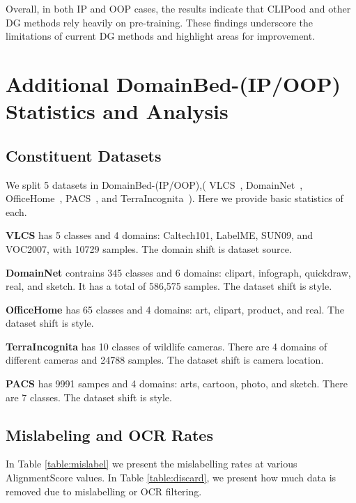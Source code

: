 \documentclass{article} %
\begin{document}
Overall, in both IP and OOP cases, the results indicate that CLIPood and other DG methods rely heavily on pre-training. These findings underscore the limitations of current DG methods and highlight areas for improvement.

\color{black}
\section{Additional DomainBed-(IP/OOP)  Statistics and Analysis}
\label{sec:addl_analysis}
\subsection{Constituent Datasets }

We split 5 datasets in DomainBed-(IP/OOP),( VLCS~\citep{fang2013unbiased}, DomainNet~\citep{peng2019moment}, OfficeHome~\citep{ganin2016domain}, PACS~\citep{li2017deeper}, and TerraIncognita~\citep{beery2018recognition}). Here we provide basic statistics of each.

\textbf{VLCS} has 5 classes and  4 domains: Caltech101, LabelME, SUN09, and VOC2007, with 10729 samples. The domain shift is dataset source. 

\textbf{DomainNet} contrains 345 classes and 6 domains: clipart, infograph, quickdraw, real, and sketch. It has a total of 586,575 samples. The dataset shift is style.

\textbf{OfficeHome} has 65 classes and 4 domains: art, clipart, product, and real. The dataset shift is style. 

\textbf{TerraIncognita} has 10 classes of wildlife cameras. There are 4 domains of different cameras and 24788 samples.  The dataset shift is camera location. 

\textbf{PACS} has 9991 sampes and 4 domains: arts, cartoon, photo, and sketch. There are 7 classes.  The dataset shift is style. 



\subsection{Mislabeling and OCR Rates}

In Table \ref{table:mislabel} we present the mislabelling rates at various AlignmentScore values.  In Table \ref{table:discard}, we present how much data is removed due to mislabelling or OCR filtering.  
\end{document}
